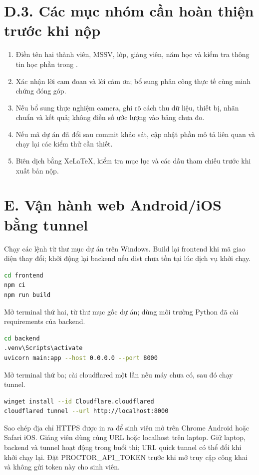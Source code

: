 \section*{D.3. Các mục nhóm cần hoàn thiện trước khi nộp}
{\small
\begin{enumerate}[itemsep=2pt,topsep=3pt]
\item Điền tên hai thành viên, MSSV, lớp, giảng viên, năm học và kiểm tra thông tin học phần trong .
\item Xác nhận lời cam đoan và lời cảm ơn; bổ sung phân công thực tế cùng minh chứng đóng góp.
\item Nếu bổ sung thực nghiệm camera, ghi rõ cách thu dữ liệu, thiết bị, nhãn chuẩn và kết quả; không điền số ước lượng vào bảng chưa đo.
\item Nếu mã dự án đã đổi sau commit khảo sát, cập nhật phần mô tả liên quan và chạy lại các kiểm thử cần thiết.
\item Biên dịch bằng XeLaTeX, kiểm tra mục lục và các dấu tham chiếu trước khi xuất bản nộp.
\end{enumerate}
}

\clearpage
\section*{E. Vận hành web Android/iOS bằng tunnel}
Chạy các lệnh từ thư mục dự án trên Windows. Build lại frontend khi mã giao diện thay đổi; khởi động lại backend nếu dist chưa tồn tại lúc dịch vụ khởi chạy.
\begin{lstlisting}[language=bash,caption={Build frontend}]
cd frontend
npm ci
npm run build
\end{lstlisting}
Mở terminal thứ hai, từ thư mục gốc dự án; dùng môi trường Python đã cài requirements của backend.
\begin{lstlisting}[language=bash,caption={Chạy FastAPI và phục vụ frontend/dist}]
cd backend
.venv\Scripts\activate
uvicorn main:app --host 0.0.0.0 --port 8000
\end{lstlisting}
Mở terminal thứ ba; cài cloudflared một lần nếu máy chưa có, sau đó chạy tunnel.
\begin{lstlisting}[language=bash,caption={Cấp đường dẫn HTTPS cho thiết bị ngoài laptop}]
winget install --id Cloudflare.cloudflared
cloudflared tunnel --url http://localhost:8000
\end{lstlisting}
Sao chép địa chỉ HTTPS được in ra để sinh viên mở trên Chrome Android hoặc Safari iOS. Giảng viên dùng cùng URL hoặc localhost trên laptop. Giữ laptop, backend và tunnel hoạt động trong buổi thi; URL quick tunnel có thể đổi khi khởi chạy lại. Đặt PROCTOR\_API\_TOKEN trước khi mở truy cập công khai và không gửi token này cho sinh viên.

